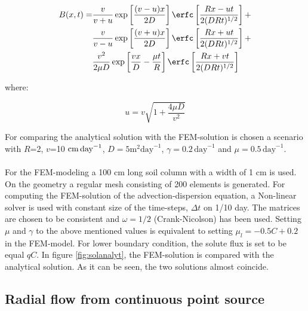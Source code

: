 \begin{equation}
\begin{split}
B(x,t)=&\frac{v}{v+u}\exp\left[\frac{(v-u)x}{2D}\right]\erfc\left[\frac{Rx-ut}{2(DRt)^{1/2}}\right]
+\\
&
\frac{v}{v-u}\exp\left[\frac{(v+u)x}{2D}\right]\erfc\left[\frac{Rx+ut}{2(DRt)^{1/2}}\right]
+\\ &
 \frac{v^2}{2\mu D}\exp\left[\frac{vx}{D}-\frac{\mu
     t}{R}\right]\erfc\left[\frac{Rx+vt}{2(DRt)^{1/2}}\right]
\end{split}
\end{equation}

where:

\begin{equation}
u=v \sqrt{1+\frac{4\mu D}{v^2}}
\end{equation}

For comparing the analytical solution with the FEM-solution is chosen
a scenario with $R$=2, $v$=10 $\text{cm\,day}^{-1}$, $D=5
\text{m}^2\text{day}^{-1}$, $\gamma=0.2 \, \text{day}^{-1}$ and
$\mu=0.5\, \text{day}^{-1}$. \\
\\

For the FEM-modeling a 100 cm long soil column with a width
of 1 cm is used. On the geometry a regular mesh consisting
of 200 elements is generated. For computing the FEM-solution of the
advection-dispersion equation, a Non-linear solver is used with
constant size of the time-steps, $\Delta t$ on 1/10 day. The matrices
are chosen to be consistent and $\omega=1/2$ (Crank-Nicolson) has been
used. Setting $\mu$ and $\gamma$ to the above mentioned values is
equivalent to setting $\mu_l=-0.5C+0.2$ in the FEM-model. For lower
boundary condition, the solute flux is set to be equal $qC$. In
figure \ref{fig:solanalyt}, the FEM-solution is compared with the
analytical solution. As it can be seen, the two solutions almost
coincide.





\subsection{Radial flow from continuous point
  source}


